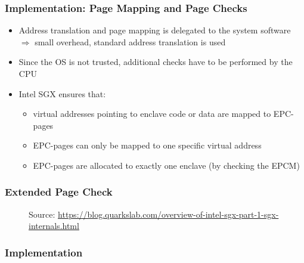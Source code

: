 \begin{frame}
    \frametitle{Implementation: Page Mapping and Page Checks}
    \begin{itemize}[<+->]
        \item Address translation and page mapping is delegated to the system software \newline
              $\Rightarrow$ small overhead, standard address translation is used
        \item Since the OS is not trusted, additional checks have to be performed by the CPU
        \item Intel SGX ensures that: 
            \begin{itemize}
                \item virtual addresses pointing to enclave code or data are mapped to EPC-pages
                \item EPC-pages can only be mapped to one specific virtual address
                \item EPC-pages are allocated to exactly one enclave (by checking the EPCM)
            \end{itemize}
    \end{itemize}
\end{frame}

\begin{frame}
    \frametitle{Extended Page Check}
    \begin{figure}
        \centering
        \caption*{Source: \url{https://blog.quarkslab.com/overview-of-intel-sgx-part-1-sgx-internals.html}}
    \end{figure}
\end{frame}

\begin{frame}
    \frametitle{Implementation}
    \begin{itemize}
    \end{itemize}
\end{frame}

